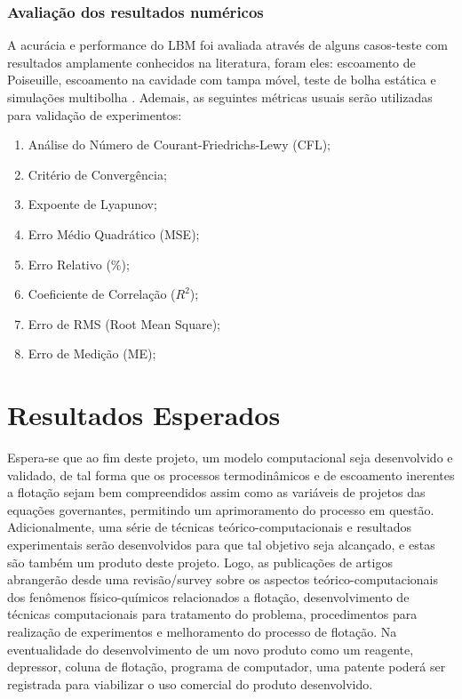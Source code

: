 \documentclass[12pt]{article}
\begin{document}
\subsubsection{Avaliação dos resultados numéricos}
A acurácia e performance do LBM foi avaliada através de alguns casos-teste com resultados amplamente conhecidos na literatura, foram eles: escoamento de Poiseuille, escoamento na cavidade com tampa móvel,\cite{chen1996boundary} teste de bolha estática e simulações multibolha \cite{gupta2007lattice,jones1975interrelation,takada2001simulation}. Ademais, as seguintes métricas usuais serão utilizadas para validação de experimentos\cite{oberkampf1994proposed}: 

\begin{enumerate}
    \item Análise do Número de Courant-Friedrichs-Lewy (CFL);
    
    \item Critério de Convergência;
    
    \item Expoente de Lyapunov;
        \item Erro Médio Quadrático (MSE);
    
    \item Erro Relativo (\%);
    
    \item Coeficiente de Correlação ($R^2$);
    
    \item Erro de RMS (Root Mean Square);
    
    \item Erro de Medição (ME);
\end{enumerate}



\section{Resultados Esperados}
Espera-se que ao fim deste projeto, um modelo computacional seja desenvolvido e validado, de tal forma que os processos termodinâmicos e de escoamento inerentes a flotação sejam bem compreendidos assim como as variáveis de projetos das equações governantes, permitindo um aprimoramento do processo em questão.\newline
Adicionalmente, uma série de técnicas teórico-computacionais e resultados experimentais serão desenvolvidos para que tal objetivo seja alcançado, e estas são também um produto deste projeto. Logo, as publicações de artigos abrangerão desde uma revisão/survey sobre os aspectos teórico-computacionais dos fenômenos físico-químicos relacionados a flotação, desenvolvimento de técnicas computacionais para tratamento do problema, procedimentos para realização de experimentos e melhoramento do processo de flotação.\newline
Na eventualidade do desenvolvimento de um novo produto como um reagente, depressor, coluna de flotação, programa de computador, uma patente poderá ser registrada para viabilizar o uso comercial do produto desenvolvido.
\end{document}
